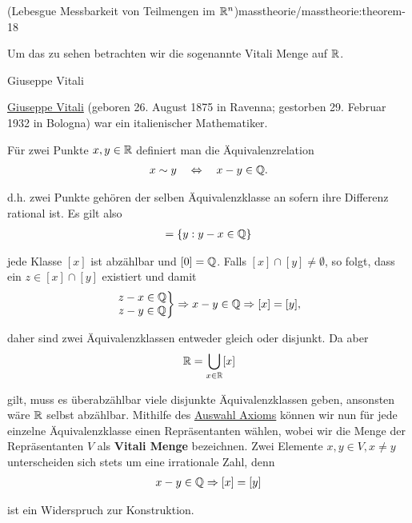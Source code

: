 \begin{theorem}{(Lebesgue Messbarkeit von Teilmengen im \protect\(\mathbb{R}^n\protect\))}{masstheorie/masstheorie:theorem-18}
\par
Um das zu sehen betrachten wir die sogenannte Vitali Menge auf \(\mathbb{R}\).

\begin{emphBox}{Giuseppe Vitali}{}

\par
\href{https://de.wikipedia.org/wiki/Giuseppe\_Vitali}{Giuseppe Vitali} (geboren 26. August 1875 in Ravenna; gestorben 29. Februar 1932 in Bologna) war ein italienischer Mathematiker.
\end{emphBox}

\par
Für zwei Punkte \(x,y\in\mathbb{R}\) definiert man die Äquivalenzrelation
\begin{align*}
x \sim y \quad \Leftrightarrow \quad x-y \in \mathbb{Q}.
\end{align*}
\par
d.h. zwei Punkte gehören der selben Äquivalenzklasse an sofern ihre Differenz rational ist. Es gilt also
\begin{align*}
[x] = \{y: y-x\in\Q\}
\end{align*}
\par
jede Klasse \([x]\) ist abzählbar und \([0] = \mathbb{Q}\). Falls \([x]\cap [y]\neq \emptyset\), so folgt, dass ein \(z\in[x]\cap [y]\) existiert und damit
\begin{align*}
\left.
\begin{matrix}
z-x\in\mathbb{Q}\\
z-y\in\mathbb{Q}\\
\end{matrix}
\right\}
\Rightarrow x-y\in\mathbb{Q}\Rightarrow [x]=[y],
\end{align*}
\par
daher sind zwei Äquivalenzklassen entweder gleich oder disjunkt. Da aber
\begin{align*}
\mathbb{R} = \bigcup_{x\in\mathbb{R}} [x]
\end{align*}
\par
gilt, muss es überabzählbar viele disjunkte Äquivalenzklassen geben, ansonsten wäre \(\mathbb{R}\) selbst abzählbar. Mithilfe des \href{https://de.wikipedia.org/wiki/Auswahlaxiom}{Auswahl Axioms} können wir nun für jede einzelne Äquivalenzklasse einen Repräsentanten wählen, wobei wir die Menge der Repräsentanten \(V\) als \textbf{Vitali Menge} bezeichnen. Zwei Elemente \(x,y\in V, x\neq y\) unterscheiden sich stets um eine irrationale Zahl, denn
\begin{align*}
x-y\in\mathbb{Q} \Rightarrow [x] = [y]
\end{align*}
\par
ist ein Widerspruch zur Konstruktion.


\end{theorem}
